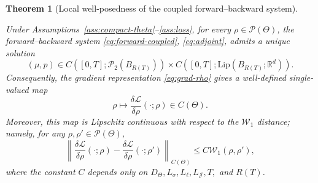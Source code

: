 \documentclass[11pt,a4wide]{article}
\newtheorem{theorem}{Theorem}[section]
\theoremstyle{definition}
\newcommand{\R}{\mathbb{R}}
\newcommand{\Prob}{\mathcal{P}}
\newcommand{\Wass}{\mathcal{W}}
\begin{document}
\begin{theorem}[Local well-posedness of the coupled forward--backward system]
\label{thm:fb-wp}

Under Assumptions~\ref{ass:compact-theta}--\ref{ass:loss}, for every
$\rho\in\Prob(\Theta)$, the forward--backward system
\eqref{eq:forward-coupled}, \eqref{eq:adjoint}, admits a unique solution
\[
(\mu,p)
\in
C([0,T];\Prob_2(B_{R(T)}))
\times
C([0,T];\mathrm{Lip}(B_{R(T)};\mathbb R^d)).
\]
Consequently, the gradient representation \eqref{eq:grad-rho}  gives  a
well-defined single-valued map
\[
\rho
\longmapsto
\frac{\delta\mathcal L}{\delta\rho}(\cdot; \rho)
\in C(\Theta).
\]
Moreover, this map is Lipschitz continuous with respect to the
$\Wass_1$ distance; namely, for any
$\rho,\rho'\in\Prob(\Theta)$,
\[
\left\|
\frac{\delta\mathcal L}{\delta\rho}(\cdot;\rho)
-
\frac{\delta\mathcal L}{\delta\rho}(\cdot;\rho')
\right\|_{C(\Theta)}
\le
C
\Wass_1(\rho,\rho'),
\]
where the constant $C$ depends only on
$D_\Theta,L_\sigma,L_\ell,L_{\mathcal J},T,$ and $R(T)$.
\end{theorem}
\end{document}
